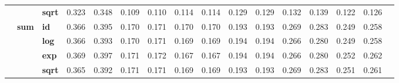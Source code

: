 \begin{table}[t]
{\begin{tabular}{cclccccccccccccc}
                & & \textbf{sqrt} & 0.323 & 0.348 & 0.109 & 0.110 & 0.114 & 0.114 & 0.129 & 0.129 & 0.132 & 0.139 & 0.122 & 0.126 \\
        \cmidrule{2-15}
        & \multirow{4}{*}{\textbf{sum}}
                  & \textbf{id}   & 0.366 & 0.395 & 0.170 & 0.171 & 0.170 & 0.170 & 0.193 & 0.193 & 0.269 & 0.283 & 0.249 & 0.258 \\
                & & \textbf{log}  & 0.366 & 0.393 & 0.170 & 0.171 & 0.169 & 0.169 & 0.194 & 0.194 & 0.266 & 0.280 & 0.249 & 0.258 \\
                & & \textbf{exp}  & 0.369 & 0.397 & 0.171 & 0.172 & 0.167 & 0.167 & 0.194 & 0.194 & 0.266 & 0.280 & 0.252 & 0.262 \\
                & & \textbf{sqrt} & 0.365 & 0.392 & 0.171 & 0.171 & 0.169 & 0.169 & 0.193 & 0.193 & 0.269 & 0.283 & 0.251 & 0.261 \\
        \midrule


\end{tabular}}
\end{table}
